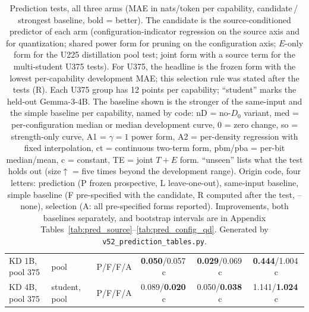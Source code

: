 \begin{table}[!t]
\begin{tabular}{@{}>{\raggedright\arraybackslash}p{4.15cm}>{\raggedright\arraybackslash}p{1.4cm}lccc@{}}
KD 1B, pool 375 & pool & P/F/F/A & \textbf{0.050}/0.057{\scriptsize\,c} & \textbf{0.029}/0.069{\scriptsize\,c} & \textbf{0.444}/1.004{\scriptsize\,c} \\
KD 4B, pool 375 & student, pool & P/F/F/A & 0.089/\textbf{0.020}{\scriptsize\,c} & 0.050/\textbf{0.038}{\scriptsize\,c} & 1.141/\textbf{1.024}{\scriptsize\,c} \\
\bottomrule\end{tabular}
\caption{\scriptsize Prediction tests, all three arms (MAE in nats/token per capability, candidate\,/\,strongest baseline, bold = better). The candidate is the source-conditioned predictor of each arm (configuration-indicator regression on the source axis and for quantization; shared power form for pruning on the configuration axis; $E$-only form for the U225 distillation pool test; joint form with a source term for the multi-student U375 tests). For U375, the headline is the frozen form with the lowest per-capability development MAE; this selection rule was stated after the tests (R). Each U375 group has 12 points per capability; ``student'' marks the held-out Gemma-3-4B. The baseline shown is the stronger of the same-input and the simple baseline per capability, named by code: nD = no-$D_0$ variant, med = per-configuration median or median development curve, 0 = zero change, so = strength-only curve, A1 = $\gamma{=}1$ power form, A2 = per-density regression with fixed interpolation, ct = continuous two-term form, pbm/pba = per-bit median/mean, c = constant, TE = joint $T{+}E$ form. ``unseen'' lists what the test holds out (size$\uparrow$ = five times beyond the development range). Origin code, four letters: prediction (P frozen prospective, L leave-one-out), same-input baseline, simple baseline (F pre-specified with the candidate, R computed after the test, -- none), selection (A: all pre-specified forms reported). Improvements, both baselines separately, and bootstrap intervals are in Appendix Tables~\ref{tab:pred_source}--\ref{tab:pred_config_qd}. Generated by \texttt{v52\_prediction\_tables.py}.}
\label{tab:pred_main}\end{table}
